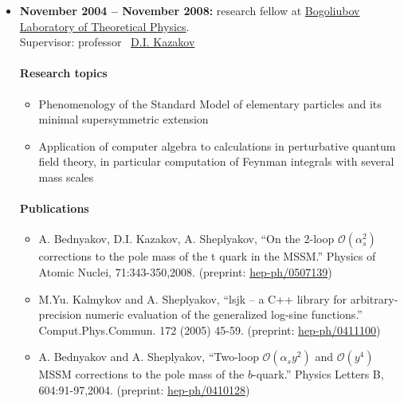 \documentclass{report}
\newcommand{\Obig}[1]{\ensuremath{\mathcal{O}(#1)}}
\begin{document}
\begin{itemize}
\item {\bf November 2004 -- November 2008:} research fellow at
  \href{http://theor.jinr.ru}{Bogoliubov Laboratory of Theoretical Physics}. \\
  Supervisor: professor~%
  \href{http://theor.jinr.ru/~kazakovd}{D.I. Kazakov} \\
  \paragraph{Research topics}
    \begin{itemize}
      \item Phenomenology of the Standard Model of elementary particles
	      and its minimal supersymmetric extension
      \item Application of computer algebra to calculations in perturbative
            quantum field theory, in particular computation of Feynman integrals
	    with several mass scales 
    \end{itemize}

   \paragraph{Publications}
    \begin{itemize}
      \item
        A. Bednyakov, D.I. Kazakov, A. Sheplyakov,
        ``On the 2-loop $\Obig{\alpha_s^2}$ corrections to the pole mass of the t
          quark in the MSSM.''
        Physics of Atomic Nuclei, 71:343-350,2008.
        (preprint: \href{http://arxiv.org/abs/hep-ph/0507139}{hep-ph/0507139})
      \item
        M.Yu. Kalmykov and A. Sheplyakov,
	``lsjk -- a C++ library for arbitrary-precision numeric evaluation of
          the generalized log-sine functions.''
        Comput.Phys.Commun. 172 (2005) 45-59.
	(preprint: \href{http://arxiv.org/abs/hep-ph/0411100}{hep-ph/0411100})
      \item
        A. Bednyakov and A. Sheplyakov,
	``Two-loop $\Obig{\alpha_s y^2}$ and $\Obig{y^4}$ MSSM corrections to
	  the pole mass of the $b$-quark.''
        Physics Letters B, 604:91-97,2004.
        (preprint: \href{http://arxiv.org/abs/hep-ph/0410128}{hep-ph/0410128})
    \end{itemize}


\end{itemize}
\end{document}
